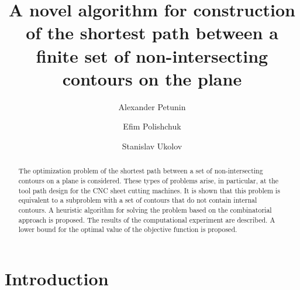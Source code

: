 \documentclass[runningheads]{llncs}
\begin{document}
\title{A novel algorithm for construction of the shortest path between a finite set of non-intersecting contours on the plane}

\author{
  Alexander	Petunin 
  \and
  Efim	Polishchuk 
  \and
  Stanislav	Ukolov 
}

\maketitle              %

\begin{abstract}
The optimization problem of the shortest path
between a set of non-intersecting contours on a plane is considered.
These types of problems arise, in particular,
at the tool path design for the CNC sheet cutting machines.
It is shown that this problem is equivalent to a subproblem
with a set of contours that do not contain internal contours.
A heuristic algorithm for solving the problem based on the combinatorial approach is proposed.
The results of the computational experiment are described.
A lower bound for the optimal value of the objective function is proposed.

\end{abstract}

\section{Introduction}
\end{document}
